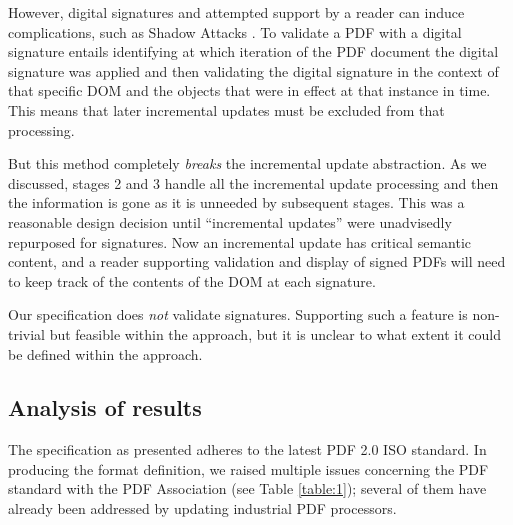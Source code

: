 However, digital signatures and attempted support by a reader can
induce complications, such as Shadow Attacks
\cite{mladenovTrillionDollarRefund2019,ndsssymposiumNDSS2021Shadow2021}.
%
To validate a PDF with a digital signature entails identifying at
which iteration of the PDF document the digital signature was applied
and then validating the digital signature in the context of that
specific DOM and the objects that were in effect at that instance in
time. This means that later incremental updates must be excluded from
that processing.

But this method completely \emph{breaks} the incremental update
abstraction.  As we discussed, stages 2 and 3 handle all
the incremental update processing and then the information is gone as
it is unneeded by subsequent stages.
% 
This was a reasonable design decision until ``incremental updates'' were
unadvisedly repurposed for signatures.  Now an incremental update has
critical semantic content, and a reader supporting validation and display of
signed PDFs will need to keep track of the contents of the DOM at each
signature.

Our specification does \emph{not} validate signatures.
%
Supporting such a feature is non-trivial but feasible within the
\ssp{} approach, but it is unclear to what extent it could be defined
within the \dsp{} approach.


\subsection{Analysis of results}
\label{sec:results-analysis}

The specification as presented adheres to the latest PDF 2.0 ISO standard.
In producing the format definition, we raised multiple issues
concerning the PDF standard with the PDF Association (see Table
\ref{table:1});
%
several of them have already been addressed by updating industrial PDF
processors.

